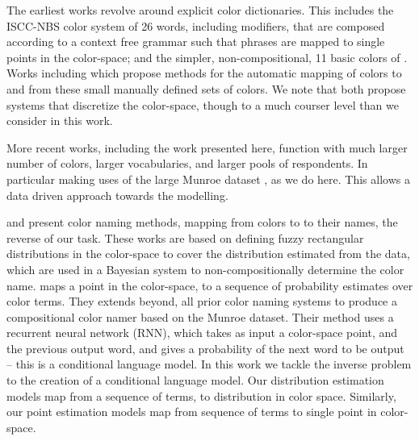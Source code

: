 \documentclass[11pt,a4paper]{article}
\newcommand{\parencite}{\citep}
\newcommand{\textcite}{\citet}
\begin{document}
The earliest works revolve around explicit color dictionaries.
This includes the ISCC-NBS color system \parencite{kelly1955iscc} of 26 words, including modifiers, that are composed according to a context free grammar such that phrases are mapped to single points in the color-space;
and the simpler, non-compositional, 11 basic colors of \textcite{berlin1969basic}.
Works including \textcite{Berk:1982:HFS:358589.358606,conway1992experimental,ele1994computational, mojsilovic2005computational, menegaz2007discrete,van2009learning} which propose methods for the automatic mapping of colors to and from these small manually defined sets of colors.
We note that \textcite{menegaz2007discrete,van2009learning} both propose systems that discretize the color-space, though to a much courser level than we consider in this work.


More recent works, including the work presented here, function with much larger number of colors, larger vocabularies, and larger pools of respondents.
In particular making uses of the large Munroe dataset \textcite{Munroe2010XKCDdataset}, as we do here.
This allows a data driven approach towards the modelling.

\textcite{mcmahan2015bayesian} and \textcite{meomcmahanstone:color} present color naming methods, mapping from colors to to their names, the reverse of our task.
These works are based on defining fuzzy rectangular distributions in the color-space to cover the distribution estimated from the data, which are used in a Bayesian system to non-compositionally determine the color name.
%
%
\textcite{2016arXiv160603821M} maps a point in the color-space, to a sequence of probability estimates over color terms.
They extends beyond, all prior color naming systems to produce a compositional color namer based on the Munroe dataset.
Their method uses a recurrent neural network (RNN), which takes as input a color-space point, and the previous output word, and gives a probability of the next word to be output -- this is a conditional language model.
In this work we tackle the inverse problem to the creation of a conditional language model.
Our distribution estimation models map from a sequence of terms, to distribution in color space.
Similarly, our point estimation models map from sequence of terms to single point in color-space.
\end{document}

